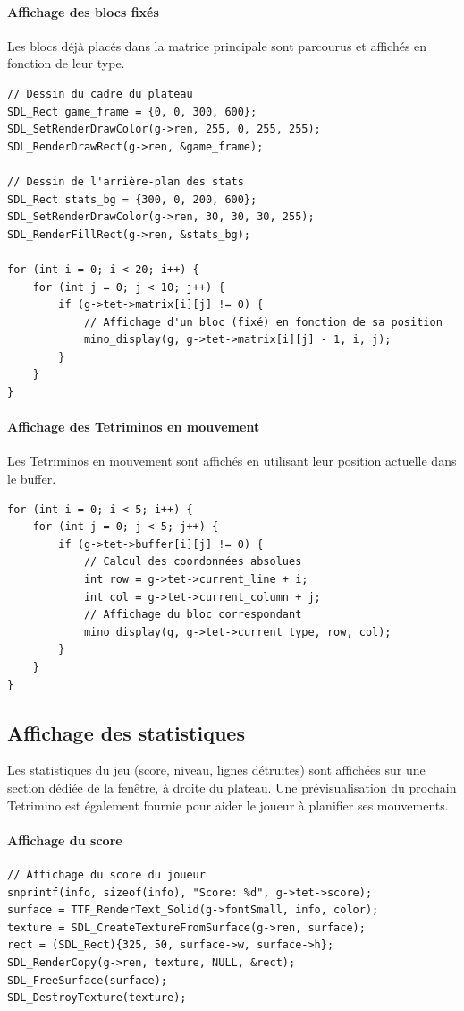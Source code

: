 \documentclass[12pt,a4paper]{report}
\begin{document}
\paragraph{Affichage des blocs fixés}
Les blocs déjà placés dans la matrice principale sont parcourus et affichés en fonction de leur type.

\begin{lstlisting}
// Dessin du cadre du plateau
SDL_Rect game_frame = {0, 0, 300, 600};
SDL_SetRenderDrawColor(g->ren, 255, 0, 255, 255);
SDL_RenderDrawRect(g->ren, &game_frame);

// Dessin de l'arrière-plan des stats
SDL_Rect stats_bg = {300, 0, 200, 600};
SDL_SetRenderDrawColor(g->ren, 30, 30, 30, 255);
SDL_RenderFillRect(g->ren, &stats_bg);
        
for (int i = 0; i < 20; i++) {
    for (int j = 0; j < 10; j++) {
        if (g->tet->matrix[i][j] != 0) {
            // Affichage d'un bloc (fixé) en fonction de sa position
            mino_display(g, g->tet->matrix[i][j] - 1, i, j);
        }
    }
}
\end{lstlisting}

\paragraph{Affichage des Tetriminos en mouvement}
Les Tetriminos en mouvement sont affichés en utilisant leur position actuelle dans le buffer.

\begin{lstlisting}
for (int i = 0; i < 5; i++) {
    for (int j = 0; j < 5; j++) {
        if (g->tet->buffer[i][j] != 0) {
            // Calcul des coordonnées absolues
            int row = g->tet->current_line + i;
            int col = g->tet->current_column + j;
            // Affichage du bloc correspondant
            mino_display(g, g->tet->current_type, row, col);
        }
    }
}
\end{lstlisting}

\newpage
\subsection{Affichage des statistiques}
Les statistiques du jeu (score, niveau, lignes détruites) sont affichées sur une section dédiée de la fenêtre, à droite du plateau. Une prévisualisation du prochain Tetrimino est également fournie pour aider le joueur à planifier ses mouvements.

\paragraph{Affichage du score}
\begin{lstlisting}
// Affichage du score du joueur
snprintf(info, sizeof(info), "Score: %d", g->tet->score);
surface = TTF_RenderText_Solid(g->fontSmall, info, color);
texture = SDL_CreateTextureFromSurface(g->ren, surface);
rect = (SDL_Rect){325, 50, surface->w, surface->h};
SDL_RenderCopy(g->ren, texture, NULL, &rect);
SDL_FreeSurface(surface);
SDL_DestroyTexture(texture);
\end{lstlisting}
\end{document}
